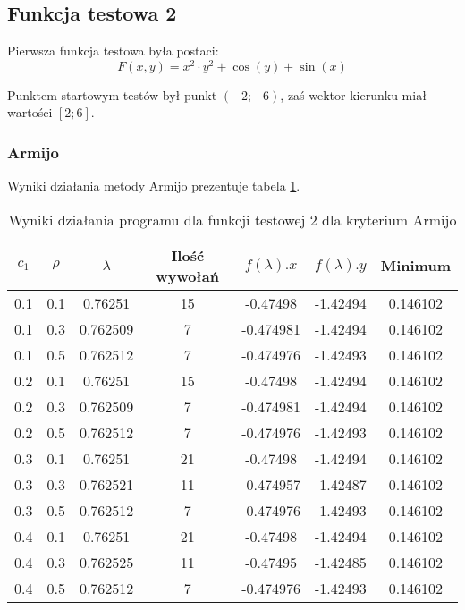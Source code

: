 \documentclass{classrep}
\begin{document}
\subsection{Funkcja testowa 2}
Pierwsza funkcja testowa była postaci:
\begin{equation}
 F(x, y) = x^2 \cdot y^2 + \cos(y) + \sin(x)
\end{equation}

Punktem startowym testów był punkt $(-2; -6)$, zaś wektor kierunku miał wartości $[2; 6]$.

\subsubsection{Armijo}

Wyniki działania metody Armijo prezentuje tabela \ref{armijo2}.

\begin{table}
  \centering
  \caption{Wyniki działania programu dla funkcji testowej 2 dla kryterium Armijo}
  \label{armijo2}
  \begin{tabular}{|c|c|c|c|c|c|c|}
    \hline
    $c_1$ & $\rho$ & $\lambda$ & Ilość wywołań & $f(\lambda).x$ & $f(\lambda).y$ & Minimum \\
    \hline
    0.1 & 0.1 & 0.76251 & 15 & -0.47498 & -1.42494 & 0.146102 \\
    0.1 & 0.3 & 0.762509 & 7 & -0.474981 & -1.42494 & 0.146102 \\
    0.1 & 0.5 & 0.762512 & 7 & -0.474976 & -1.42493 & 0.146102 \\
    0.2 & 0.1 & 0.76251 & 15 & -0.47498 & -1.42494 & 0.146102 \\
    0.2 & 0.3 & 0.762509 & 7 & -0.474981 & -1.42494 & 0.146102 \\
    0.2 & 0.5 & 0.762512 & 7 & -0.474976 & -1.42493 & 0.146102 \\
    0.3 & 0.1 & 0.76251 & 21 & -0.47498 & -1.42494 & 0.146102 \\
    0.3 & 0.3 & 0.762521 & 11 & -0.474957 & -1.42487 & 0.146102 \\
    0.3 & 0.5 & 0.762512 & 7 & -0.474976 & -1.42493 & 0.146102 \\
    0.4 & 0.1 & 0.76251 & 21 & -0.47498 & -1.42494 & 0.146102 \\
    0.4 & 0.3 & 0.762525 & 11 & -0.47495 & -1.42485 & 0.146102 \\
    0.4 & 0.5 & 0.762512 & 7 & -0.474976 & -1.42493 & 0.146102 \\
    \hline
  \end{tabular}
\end{table}
\end{document}
